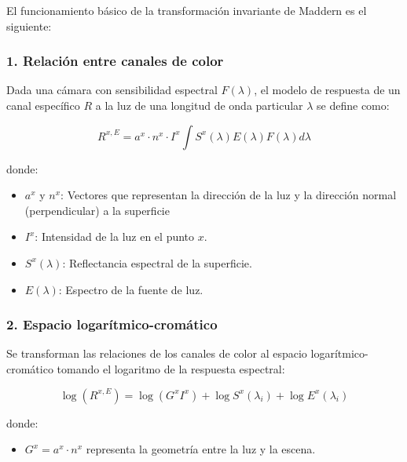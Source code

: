 El funcionamiento básico de la transformación invariante de Maddern es el siguiente:

\subsubsection{1. Relación entre canales de color}

Dada una cámara con sensibilidad espectral $F(\lambda )$, el modelo de respuesta de un canal específico $R$ a la luz de una longitud de onda particular $\lambda$ se define como:

$$R^{x,E} =a^x \cdot n^x \cdot I^x \int S^x (\lambda )E(\lambda )F(\lambda )d\lambda$$

donde:

\begin{itemize}
\setlength{\itemsep}{-1ex}
   \item{\begin{flushleft} $a^x$ y $n^x$: Vectores que representan la dirección de la luz y la dirección normal (perpendicular) a la superficie \end{flushleft}}
   \item{\begin{flushleft} $I^x$: Intensidad de la luz en el punto $x$. \end{flushleft}}
   \item{\begin{flushleft} $S^x (\lambda )$: Reflectancia espectral de la superficie. \end{flushleft}}
   \item{\begin{flushleft} $E(\lambda )$: Espectro de la fuente de luz. \end{flushleft}}
\end{itemize}

\subsubsection{2. Espacio logarítmico-cromático}

Se transforman las relaciones de los canales de color al espacio logarítmico-cromático tomando el logaritmo de la respuesta espectral:

$$\log (R^{x,E} )=\log (G^x I^x )+\log S^x (\lambda_i )+\log E^x (\lambda_i )$$

donde:

\begin{itemize}
\setlength{\itemsep}{-1ex}
   \item{\begin{flushleft} $G^x =a^x \cdot n^x$ representa la geometría entre la luz y la escena. \end{flushleft}}
\end{itemize}

